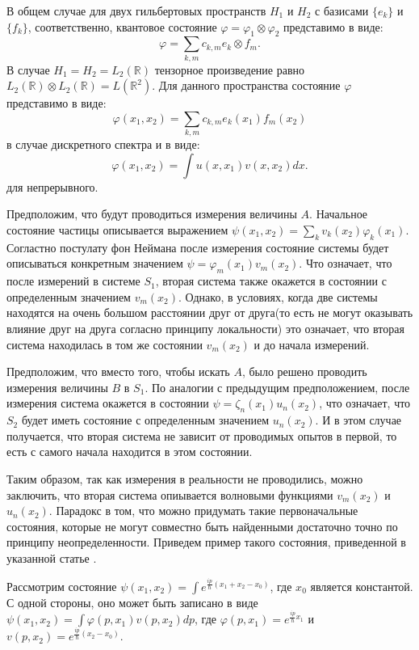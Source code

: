 \documentclass[%
master,         %
subf,           %
href,           %
colorlinks=true %
]{disser}
\numberwithin{equation}{section}
\numberwithin{figure}{section}
\begin{document}
В общем случае для двух гильбертовых пространств $H_1$ и $H_2$ с базисами $\{e_k\}$ и $\{f_k\}$, соответственно, квантовое состояние $\varphi = \varphi_1\otimes\varphi_2$ представимо в виде:
\[
\varphi = \sum_{k, m}c_{k, m}e_k\otimes f_m.
\]
В случае  $H_1 = H_2 = L_2(\mathbb{R})$ тензорное произведение равно $L_2(\mathbb{R})\otimes L_2(\mathbb{R}) = L(\mathbb{R}^2)$. Для данного пространства состояние $\varphi$ представимо в виде:
\[
\varphi (x_1, x_2) = \sum_{k, m}c_{k, m}e_k(x_1)f_m(x_2)
\]
в случае дискретного спектра и в виде:
\[
\varphi (x_1, x_2) = \int u(x, x_1)v(x, x_2)dx.
\]
для непрерывного.

Предположим, что будут проводиться измерения величины $A$. Начальное состояние частицы описывается выражением  $\psi(x_1, x_2) = \sum_k v_k(x_2)\varphi_k(x_1)$. Согластно постулату фон Неймана после измерения состояние системы будет описываться конкретным значением $\psi = \varphi_m(x_1)v_m(x_2)$. Что означает, что после измерений в системе $S_1$, вторая система также окажется в состоянии с определенным значением $v_m(x_2)$. Однако, в условиях, когда две системы  находятся на очень большом расстоянии друг от друга(то есть не могут оказывать влияние друг на друга согласно принципу локальности) это означает, что вторая система находилась в том же состоянии $v_m(x_2)$ и до начала измерений.

Предположим, что вместо того, чтобы искать $A$, было решено проводить измерения величины  $B$ в $S_1$. По аналогии с предыдущим предположением, после измерения система окажется в состоянии $\psi = \zeta_n(x_1)u_n(x_2)$, что означает, что $S_2$ будет иметь состояние с определенным значением $u_n(x_2)$. И в этом случае получается, что вторая система не зависит от проводимых опытов в первой, то есть с самого начала находится в этом состоянии. 

Таким образом, так как измерения в реальности не проводились, можно заключить, что вторая система опиывается волновыми функциями $v_m(x_2)$ и $u_n(x_2)$. Парадокс в том, что можно придумать такие первоначальные состояния, которые не могут совместно быть найденными достаточно точно по принципу неопределенности. Приведем пример такого состояния, приведенной в  указанной статье \cite{EPR}.

Рассмотрим состояние $\psi(x_1, x_2) = \int e^{\frac{ip}{\hbar}(x_1+x_2-x_0)}$, где $x_0$ является константой. С одной стороны, оно может быть записано в виде $\psi(x_1, x_2) = \int\varphi(p, x_1)v(p, x_2)dp$, где $\varphi(p, x_1) = e^{\frac{ip}{\hbar}x_1}$ и $v(p, x_2) = e^{\frac{ip}{\hbar}(x_2-x_0)}$. 
\end{document}
